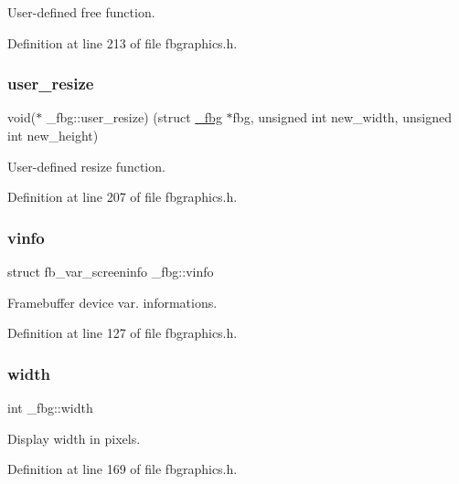 User-\/defined free function. 



Definition at line 213 of file fbgraphics.\+h.

\mbox{\label{struct__fbg_a68add70dac4b055809c1bcab1e65b18d}} 
\subsubsection{\texorpdfstring{user\+\_\+resize}{user\_resize}}
{\footnotesize\ttfamily void($\ast$ \+\_\+fbg\+::user\+\_\+resize) (struct \mbox{\hyperlink{struct__fbg}{\+\_\+fbg}} $\ast$fbg, unsigned int new\+\_\+width, unsigned int new\+\_\+height)}



User-\/defined resize function. 



Definition at line 207 of file fbgraphics.\+h.

\mbox{\label{struct__fbg_a22447f0d56680de6ff37587b44f7cf4b}} 
\subsubsection{\texorpdfstring{vinfo}{vinfo}}
{\footnotesize\ttfamily struct fb\+\_\+var\+\_\+screeninfo \+\_\+fbg\+::vinfo}



Framebuffer device var. informations. 



Definition at line 127 of file fbgraphics.\+h.

\mbox{\label{struct__fbg_a1d3c76643e4ee424f4d17e27991d5e2e}} 
\subsubsection{\texorpdfstring{width}{width}}
{\footnotesize\ttfamily int \+\_\+fbg\+::width}



Display width in pixels. 



Definition at line 169 of file fbgraphics.\+h.

